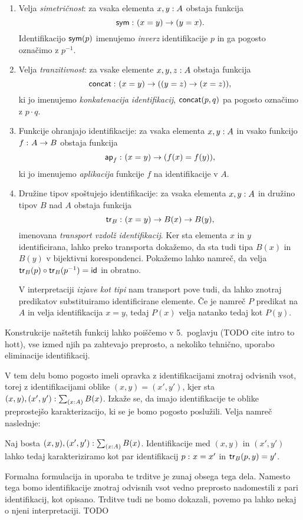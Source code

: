 \begin{enumerate}
\item Velja \emph{simetričnost}: za vsaka elementa \(x, y : A\) obstaja
  funkcija \[\textnormal{\textsf{sym}} \,\colon (x = y) \to (y = x).\] Identifikacijo \(\textnormal{\textsf{sym}}(p)\)
  imenujemo \emph{inverz} identifikacije \(p\) in ga pogosto označimo z \(p^{-1}\).
\item Velja \emph{tranzitivnost}: za vsake elemente \(x, y, z : A\) obstaja
  funkcija \[\textnormal{\textsf{concat}} \,\colon (x = y) \to ((y = z) \to (x = z)),\] ki jo imenujemo
  \emph{konkatenacija identifikacij}, \(\textnormal{\textsf{concat}}(p, q)\) pa pogosto označimo
  z \(p \cdot q\).
\item Funkcije ohranjajo identifikacije: za vsaka elementa \(x, y : A\)
  in vsako funkcijo \(f \,\colon A \to B\) obstaja funkcija
  \[\textnormal{\textsf{ap}}_{f} \,\colon (x = y) \to (f(x) = f(y)),\]
  ki jo imenujemo \emph{aplikacija} funkcije \(f\) na identifikacije v \(A\).
\item Družine tipov spoštujejo identifikacije: za vsaka elementa
  \(x, y : A\) in družino tipov
  \(B\) nad \(A\) obstaja funkcija
  \[\textnormal{\textsf{tr}}_{B} \,\colon (x = y) \to B(x) \to B(y),\]
  imenovana \emph{transport vzdolž identifikacij}.
  Ker sta elementa \(x\) in \(y\) identificirana, lahko preko transporta dokažemo, da sta
  tudi tipa \(B(x)\) in \(B(y)\) v bijektivni korespondenci. Pokažemo lahko namreč, da
  velja \(\textnormal{\textsf{tr}}_{B}(p) \circ \textnormal{\textsf{tr}}_{B}(p^{-1}) = \textnormal{\textsf{id}}_{}\) in obratno.

  V interpretaciji \emph{izjave kot tipi} nam transport pove tudi, da lahko znotraj
  predikatov substituiramo identificirane elemente. Če je namreč \(P\) predikat
  na \(A\) in velja identifikacija \(x = y\), tedaj \(P(x)\) velja natanko tedaj kot
  \(P(y)\).

\end{enumerate}
Konstrukcije naštetih funkcij lahko poiščemo v 5.~poglavju (TODO cite intro to hott), vse
izmed njih pa zahtevajo preprosto, a nekoliko tehnično, uporabo eliminacije identifikacij.

\pagebreak

V tem delu bomo pogosto imeli opravka z identifikacijami znotraj odvisnih vsot, torej z identifikacijami oblike \((x, y) = (x', y')\), kjer sta
\((x, y), (x', y') : \textstyle \sum_{\left( x : A \right)} B(x)\). Izkaže se, da imajo identifikacije te oblike preprostejšo karakterizacijo, ki se je bomo pogosto poslužili.
Velja namreč naslednje:
\begin{trditev}
  Naj bosta \((x, y), (x', y') : \textstyle \sum_{\left( x : A \right)} B(x)\). Identifikacije med \((x, y)\) in \((x', y')\) lahko tedaj karakteriziramo kot par identifikacij
  \(p \,\colon x = x'\) in \(\textnormal{\textsf{tr}}_{B}(p, y) = y'\).
\end{trditev}
Formalna formulacija in uporaba te trditve je zunaj obsega tega dela. Namesto tega bomo identifikacije znotraj odvisnih vsot vedno preprosto nadomestili z pari identifikacij, kot opisano. Trditve tudi ne bomo dokazali, povemo pa lahko nekaj o njeni interpretaciji. TODO

